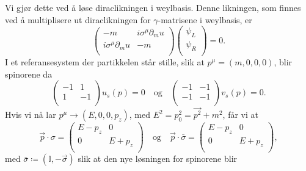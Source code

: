 \documentclass{article}
\newcommand{\I}{\mathbb{I}}
\begin{document}
Vi gjør dette ved å løse diraclikningen i weylbasis.
Denne likningen, som finnes ved å multiplisere ut diraclikningen for $\gamma$-matrisene i weylbasis, er
\begin{equation*}
    \begin{pmatrix*}
        -m & i\sigma^\mu \partial_mu \\
        i\sigma^\mu \partial_mu & -m \\
    \end{pmatrix*}
    \begin{pmatrix*}
        \psi_L \\
        \psi_R \\
    \end{pmatrix*}
    = 0.
\end{equation*}
I et referansesystem der partikkelen står stille, slik at $p^\mu = (m,0,0,0)$, blir spinorene da
\begin{equation*}
    \begin{pmatrix*}
        -1 & 1 \\
        1 & -1 \\
    \end{pmatrix*}
    u_s(p)
    = 0
\quad \text{og} \quad
    \begin{pmatrix*}
        -1 & -1 \\
        -1 & -1 \\
    \end{pmatrix*}
    v_s(p)
    = 0.
\end{equation*}
Hvis vi nå lar $p^\mu \rightarrow (E,0,0,p_z)$, med $E^2 = p_0^2 = \vec{p^2} + m^2$, får vi at 
\begin{equation*}
    \vec{p} \cdot \sigma = 
    \begin{pmatrix*}
        E - p_z & 0 \\
        0 & E + p_z \\
    \end{pmatrix*}
\quad \text{og} \quad
    \vec{p} \cdot \bar{\sigma} = 
    \begin{pmatrix*}
        E - p_z & 0 \\
        0 & E + p_z \\
    \end{pmatrix*},
\end{equation*}
med $\bar{\sigma} \coloneqq (\I, -\vec{\sigma})$ slik at den nye løsningen for spinorene blir 
\end{document}
